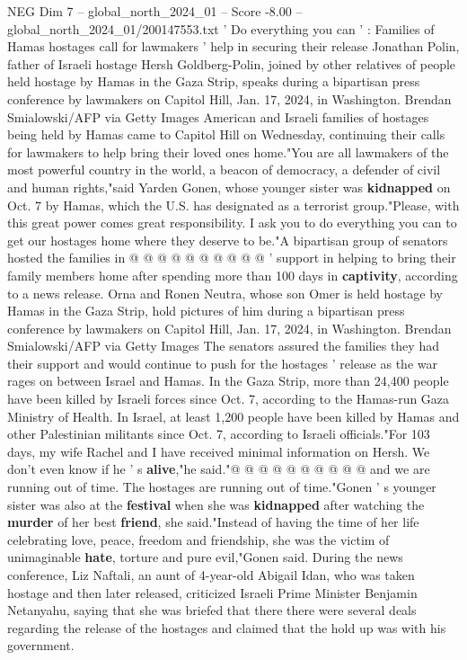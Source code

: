 \begin{textsample}{NEG Dim 7 – global\_north\_2024\_01 – Score -8.00 – global\_north\_2024\_01/200147553.txt}  \label{ex:f7_neg_205}
' Do everything you can ' : Families of Hamas hostages call for lawmakers ' help in securing their release Jonathan Polin, father of Israeli hostage Hersh Goldberg-Polin, joined by other relatives of people held hostage by Hamas in the Gaza Strip, speaks during a bipartisan press conference by lawmakers on Capitol Hill, Jan. 17, 2024, in Washington.
Brendan Smialowski/AFP via Getty Images American and Israeli families of hostages being held by Hamas came to Capitol Hill on Wednesday, continuing their calls for lawmakers to help bring their loved ones home."You are all lawmakers of the most powerful country in the world, a beacon of democracy, a defender of civil and human rights,"said Yarden Gonen, whose younger sister was \textbf{kidnapped} on Oct. 7 by Hamas, which the U.S. has designated as a terrorist group."Please, with this great power comes great responsibility.
I ask you to do everything you can to get our hostages home where they deserve to be."A bipartisan group of senators hosted the families in @ @ @ @ @ @ @ @ @ @ ' support in helping to bring their family members home after spending more than 100 days in \textbf{captivity}, according to a news release.
Orna and Ronen Neutra, whose son Omer is held hostage by Hamas in the Gaza Strip, hold pictures of him during a bipartisan press conference by lawmakers on Capitol Hill, Jan. 17, 2024, in Washington.
Brendan Smialowski/AFP via Getty Images The senators assured the families they had their support and would continue to push for the hostages ' release as the war rages on between Israel and Hamas.
In the Gaza Strip, more than 24,400 people have been killed by Israeli forces since Oct. 7, according to the Hamas-run Gaza Ministry of Health.
In Israel, at least 1,200 people have been killed by Hamas and other Palestinian militants since Oct. 7, according to Israeli officials."For 103 days, my wife Rachel and I have received minimal information on Hersh.
We don't even know if he ' s \textbf{alive},"he said."@ @ @ @ @ @ @ @ @ @ and we are running out of time.
The hostages are running out of time."Gonen ' s younger sister was also at the \textbf{festival} when she was \textbf{kidnapped} after watching the \textbf{murder} of her best \textbf{friend}, she said."Instead of having the time of her life celebrating love, peace, freedom and friendship, she was the victim of unimaginable \textbf{hate}, torture and pure evil,"Gonen said.
During the news conference, Liz Naftali, an aunt of 4-year-old Abigail Idan, who was taken hostage and then later released, criticized Israeli Prime Minister Benjamin Netanyahu, saying that she was briefed that there there were several deals regarding the release of the hostages and claimed that the hold up was with his government.

\end{textsample}
